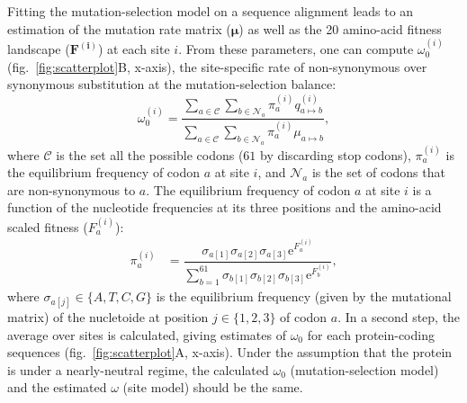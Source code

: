 \documentclass[9pt,twocolumn,twoside,lineno]{pnas-new}
\newcommand{\UniDimArray}[1]{\bm{#1}}
\newcommand{\e}{\mathrm{e}}
\begin{document}
{       Fitting the mutation-selection model on a sequence alignment leads to an estimation of the mutation rate matrix ($\UniDimArray{\mu}$) as well as the 20 amino-acid fitness landscape ($\UniDimArray{F^{(i)}}$) at each site $i$.
       From these parameters, one can compute $\omega_{0}^{(i)}$ (fig.~\ref{fig:scatterplot}B, x-axis), the site-specific rate of non-synonymous over synonymous substitution at the mutation-selection balance:
       \begin{equation}
              \omega_{0}^{(i)} = \dfrac{\sum_{a \in \mathcal{C}} \sum_{b \in \mathcal{N}_a} \pi_a^{(i)} q_{a \mapsto b}^{(i)}}{\sum_{a \in \mathcal{C}} \sum_{b \in \mathcal{N}_a} \pi_a^{(i)} \mu_{a \mapsto b}},
       \end{equation}
       where $\mathcal{C}$ is the set all the possible codons ($61$ by discarding stop codons), $\pi_a^{(i)}$ is the equilibrium frequency of codon $a$ at site $i$, and $\mathcal{N}_a$ is the set of codons that are non-synonymous to $a$\cite{spielman_relationship_2015, rodrigue_detecting_2017}.
       The equilibrium frequency of codon $a$ at site $i$ is a function of the nucleotide frequencies at its three positions and the amino-acid scaled fitness ($F_a^{(i)}$):
       \begin{align}
              \pi_a^{(i)} & = \dfrac{ \sigma_{a[1]}\sigma_{a[2]}\sigma_{a[3]} \e^{F_a^{(i)}}}{\sum\limits_{b=1}^{61}\sigma_{b[1]}\sigma_{b[2]}\sigma_{b[3]} \e^{F_b^{(i)}} },
       \end{align}
       where $\sigma_{a[j]} \in \{A, T, C, G\}$ is the equilibrium frequency (given by the mutational matrix) of the nucletoide at position $j \in \{1, 2, 3\}$ of codon $a$.
       In a second step, the average over sites is calculated, giving estimates of $\omega_{0}$ for each protein-coding sequences (fig.~\ref{fig:scatterplot}A, x-axis).
       Under the assumption that the protein is under a nearly-neutral regime, the calculated $\omega_{0}$ (mutation-selection model) and the estimated $\omega$ (site model) should be the same\cite{spielman_relationship_2015}.

}
\end{document}
